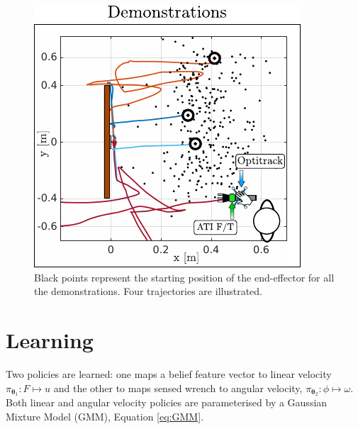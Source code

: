 \documentclass[final,5p,times,twocolumn]{elsarticle}
\newcommand{\Param}{\boldsymbol{\theta}}
\begin{document}
\begin{figure}
 \centering
   \includegraphics[width=0.9\linewidth]{./Figure/demonstrations.pdf}
   \caption{Black points represent the starting position of the end-effector
   for all the demonstrations. Four trajectories are illustrated.}
  \label{fig:experiment_setup_data}
\end{figure}

\section{Learning}\label{sec:learning-value-actor}

Two policies are learned: one maps a belief feature vector 
to linear velocity $\pi_{\Param_1} : F \mapsto u$ and the other to maps sensed wrench to angular 
velocity, $ \pi_{\Param_2} : \phi \mapsto \omega$.  Both linear and angular velocity policies are 
parameterised by a Gaussian Mixture Model (GMM), Equation \ref{eq:GMM}.
\end{document}
